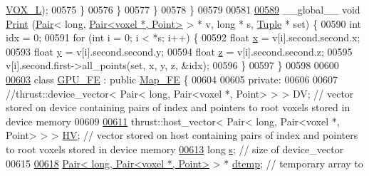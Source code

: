 \begin{DoxyCode}
{      \hyperlink{Voxel_8cuh_a3c1c8b966e30fa8ca2de07abe3b3d74a}{VOX\_L});
00575             \}
00576         \}
00577     \}
00578 \}
00579 
00581 
\hypertarget{Voxel_8cuh_source.tex_l00589}{}\hyperlink{Voxel_8cuh_afc844d313aa2b2353c757fb063b74b96}{00589} \_\_global\_\_ \textcolor{keywordtype}{void} \hyperlink{Voxel_8cuh_afc844d313aa2b2353c757fb063b74b96}{Print} (\hyperlink{classPair}{Pair}< \textcolor{keywordtype}{long}, \hyperlink{classPair}{Pair<voxel *, Point>} > * v, \textcolor{keywordtype}{long} * s, 
      \hyperlink{structTuple}{Tuple} * \textcolor{keyword}{set}) \{
00590     \textcolor{keywordtype}{int} idx = 0;
00591     \textcolor{keywordflow}{for} (\textcolor{keywordtype}{int} i = 0; i < *s; i++) \{
00592         \textcolor{keywordtype}{float} \hyperlink{classquaternion_acdcda48f9dd7ff35873aae38fa33ab78}{x} = v[i].second.second.x;
00593         \textcolor{keywordtype}{float} \hyperlink{classquaternion_a48e3d1fbf5e12eb54985c32b45dd8303}{y} = v[i].second.second.y;
00594         \textcolor{keywordtype}{float} \hyperlink{classquaternion_a538598007238d399f79ddcecd39ef5cf}{z} = v[i].second.second.z;
00595         v[i].second.first->all\_points(\textcolor{keyword}{set}, x, y, z, &idx);
00596     \}
00597 \}
00598 
00600 
\hypertarget{Voxel_8cuh_source.tex_l00603}{}\hyperlink{classGPU__FE}{00603} \textcolor{keyword}{class }\hyperlink{classGPU__FE}{GPU\_FE} : \textcolor{keyword}{public} \hyperlink{classMap__FE}{Map\_FE} \{
00604 
00605 \textcolor{keyword}{private}:
00606 
00607     \textcolor{comment}{//thrust::device\_vector< Pair< long, Pair<voxel *, Point> > > DV; // vector stored on device containing
       pairs of index and pointers to root voxels stored in device memory}
00609 \textcolor{comment}{}
\hypertarget{Voxel_8cuh_source.tex_l00611}{}\hyperlink{classGPU__FE_a7418d50e4e22db3671d9c000344aaddc}{00611}     thrust::host\_vector< Pair< long, Pair<voxel *, Point> > > \hyperlink{classGPU__FE_a7418d50e4e22db3671d9c000344aaddc}{HV}; \textcolor{comment}{// vector stored on host containing
       pairs of index and pointers to root voxels stored in device memory}
\hypertarget{Voxel_8cuh_source.tex_l00613}{}\hyperlink{classGPU__FE_a0bd3424bf1e7775fc5eef2d17714cd94}{00613} \textcolor{comment}{}    \textcolor{keywordtype}{long} \hyperlink{classGPU__FE_a0bd3424bf1e7775fc5eef2d17714cd94}{s}; \textcolor{comment}{// size of device\_vector}
00615 \textcolor{comment}{}
\hypertarget{Voxel_8cuh_source.tex_l00618}{}\hyperlink{classGPU__FE_a15cab1132ca16d50844a60cc09235567}{00618}     \hyperlink{classPair}{Pair< long, Pair<voxel *, Point>} > * \hyperlink{classGPU__FE_a15cab1132ca16d50844a60cc09235567}{dtemp}; \textcolor{comment}{// temporary array to
}}
\end{DoxyCode}
